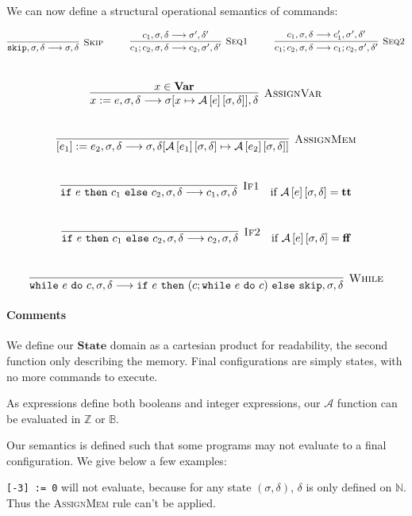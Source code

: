 \documentclass{article}
\newcommand{\var}{\mathbf{Var}}
\newcommand{\state}{\mathbf{State}}
\newcommand{\A}{\mathcal{A}}
\newcommand{\Aa}[2]{\mathcal{A}\left[#1\right]\left[#2\right]}
\newcommand{\true}{\mathbf{tt}}
\newcommand{\false}{\mathbf{ff}}
\newcommand{\Rule}[3]{\infer[\textsc{#1}]{#2}{#3}}
\begin{document}
We can now define a structural operational semantics of commands:

\[
	\Rule{Skip}{\texttt{skip}, \sigma, \delta \longrightarrow \sigma, \delta}{} \hspace*{1cm}
	\Rule{Seq1}{c_1 ; c_2, \sigma, \delta \longrightarrow c_2, \sigma', \delta'}{c_1, \sigma, \delta \longrightarrow \sigma', \delta'} \hspace*{1cm}
	\Rule{Seq2}{c_1 ; c_2, \sigma, \delta \longrightarrow c_1 ; c_2, \sigma', \delta'}{c_1, \sigma, \delta \longrightarrow c_1', \sigma', \delta'}
\]
\\
\[
	\Rule{AssignVar}{x := e, \sigma, \delta \longrightarrow \sigma[x \mapsto \Aa{e}{\sigma, \delta}], \delta}{x \in \var{}}
\]
\\
\[
	\Rule{AssignMem}{[e_1] := e_2, \sigma, \delta \longrightarrow \sigma, \delta[\Aa{e_1}{\sigma, \delta} \mapsto \Aa{e_2}{\sigma, \delta}]}{}
\]
\\
\[
	\Rule{If1}{\texttt{if}~e~\texttt{then}~c_1~\texttt{else}~c_2, \sigma, \delta \longrightarrow c_1, \sigma, \delta}{} \quad \text{if $\Aa{e}{\sigma, \delta} = \true{}$}
\]
\\
\[
	\Rule{If2}{\texttt{if}~e~\texttt{then}~c_1~\texttt{else}~c_2, \sigma, \delta \longrightarrow c_2, \sigma, \delta}{} \quad \text{if $\Aa{e}{\sigma, \delta} = \false{}$}
\]
\\
\[
	\Rule{While}{\texttt{while}~e~\texttt{do}~c, \sigma, \delta \longrightarrow \texttt{if}~e~\texttt{then}~(c; \texttt{while}~e~\texttt{do}~c)~\texttt{else}~\texttt{skip}, \sigma, \delta}{} 
\]

\paragraph{Comments}
We define our $\state$ domain as a cartesian product for readability, the second function only describing the memory.
Final configurations are simply states, with no more commands to execute.

As expressions define both booleans and integer expressions, our $\A{}$ function can be evaluated in $\mathbb{Z}$ or $\mathbb{B}$.

Our semantics is defined such that some programs may not evaluate to a final configuration. We give below a few examples:

\texttt{[-3] := 0} will not evaluate, because for any state $(\sigma,\delta)$, $\delta$ is only defined on $\mathbb{N}$. Thus the \textsc{AssignMem} rule can't be applied.
\end{document}

